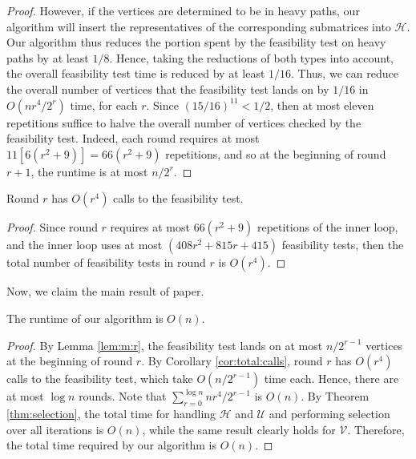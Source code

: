 \begin{proof}
However, if the vertices are determined to be in heavy paths, our algorithm will insert the representatives of the corresponding submatrices into $\mathcal{H}$. 
Our algorithm thus reduces the portion spent by the feasibility test on heavy paths by at least $1/8$.
Hence, taking the reductions of both types into account, the overall feasibility test time is reduced by at least $1/16$.
Thus, we can reduce the overall number of vertices that the feasibility test lands on by $1/16$ in $O(nr^4/2^r)$ time, for each $r$. 
Since $(15/16)^{11}<1/2$, then at most eleven repetitions suffice to halve the overall number of vertices checked by the feasibility test. 
Indeed, each round requires at most $11[6(r^2+9)]=66(r^2+9)$ repetitions, and so at the beginning of round $r+1$, the runtime is at most $n/2^r$.
\end{proof}

\begin{corollary}
\label{cor:total:calls}
Round $r$ has $O(r^4)$ calls to the feasibility test. 
\end{corollary}
\begin{proof}
Since round $r$ requires at most $66(r^2+9)$ repetitions of the inner loop, and the inner loop uses at most $(408r^2+815r+415)$ feasibility tests, then the total number of feasibility tests in round $r$ is $O(r^4)$.
\end{proof}

\noindent
Now, we claim the main result of paper.

\begin{theorem}
The runtime of our algorithm is $O(n)$.
\end{theorem}
\begin{proof}
By Lemma \ref{lem:m:r}, the feasibility test lands on at most $n/2^{r-1}$ vertices at the beginning of round $r$. 
By Corollary \ref{cor:total:calls}, round $r$ has $O(r^4)$ calls to the feasibility test, which take $O(n/2^{r-1})$ time each.
Hence, there are at most $\log n$ rounds. 
Note that $\sum_{r=0}^{\log n} nr^4/2^{r-1}$ is $O(n)$. By Theorem \ref{thm:selection}, the total time for handling $\mathcal{H}$ and $\mathcal{U}$ and performing selection over all iterations is $O(n)$, while the same result clearly holds for $\mathcal{V}$. 
Therefore, the total time required by our algorithm is $O(n)$.
\end{proof}